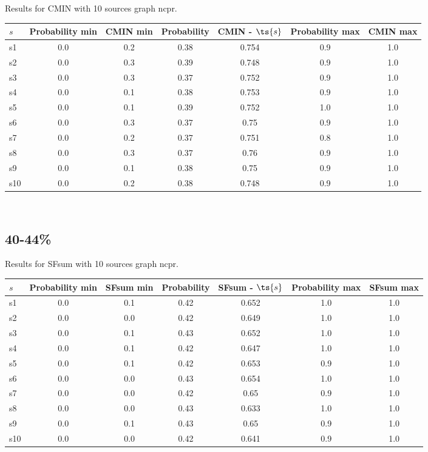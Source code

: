 \documentclass{article}
\begin{document}
\noindent Results for CMIN with 10 sources graph ncpr.

\noindent\begin{tabular}{|l|c|c|c|c|c|c|}
\hline
$s$& Probability min & CMIN min & Probability & CMIN - $\ts{s}$ & Probability max & CMIN max\\
\hline
s1 &0.0 & 0.2 & 0.38 & 0.754 & 0.9 & 1.0\\
\hline
s2 &0.0 & 0.3 & 0.39 & 0.748 & 0.9 & 1.0\\
\hline
s3 &0.0 & 0.3 & 0.37 & 0.752 & 0.9 & 1.0\\
\hline
s4 &0.0 & 0.1 & 0.38 & 0.753 & 0.9 & 1.0\\
\hline
s5 &0.0 & 0.1 & 0.39 & 0.752 & 1.0 & 1.0\\
\hline
s6 &0.0 & 0.3 & 0.37 & 0.75 & 0.9 & 1.0\\
\hline
s7 &0.0 & 0.2 & 0.37 & 0.751 & 0.8 & 1.0\\
\hline
s8 &0.0 & 0.3 & 0.37 & 0.76 & 0.9 & 1.0\\
\hline
s9 &0.0 & 0.1 & 0.38 & 0.75 & 0.9 & 1.0\\
\hline
s10 &0.0 & 0.2 & 0.38 & 0.748 & 0.9 & 1.0\\
\hline
\end{tabular}\\

\newpage

\subsection{40-44\%}

\noindent Results for SFsum with 10 sources graph ncpr.

\noindent\begin{tabular}{|l|c|c|c|c|c|c|}
\hline
$s$& Probability min & SFsum min & Probability & SFsum - $\ts{s}$ & Probability max & SFsum max\\
\hline
s1 &0.0 & 0.1 & 0.42 & 0.652 & 1.0 & 1.0\\
\hline
s2 &0.0 & 0.0 & 0.42 & 0.649 & 1.0 & 1.0\\
\hline
s3 &0.0 & 0.1 & 0.43 & 0.652 & 1.0 & 1.0\\
\hline
s4 &0.0 & 0.1 & 0.42 & 0.647 & 1.0 & 1.0\\
\hline
s5 &0.0 & 0.1 & 0.42 & 0.653 & 0.9 & 1.0\\
\hline
s6 &0.0 & 0.0 & 0.43 & 0.654 & 1.0 & 1.0\\
\hline
s7 &0.0 & 0.0 & 0.42 & 0.65 & 0.9 & 1.0\\
\hline
s8 &0.0 & 0.0 & 0.43 & 0.633 & 1.0 & 1.0\\
\hline
s9 &0.0 & 0.1 & 0.43 & 0.65 & 0.9 & 1.0\\
\hline
s10 &0.0 & 0.0 & 0.42 & 0.641 & 0.9 & 1.0\\
\hline
\end{tabular}\\
\end{document}
